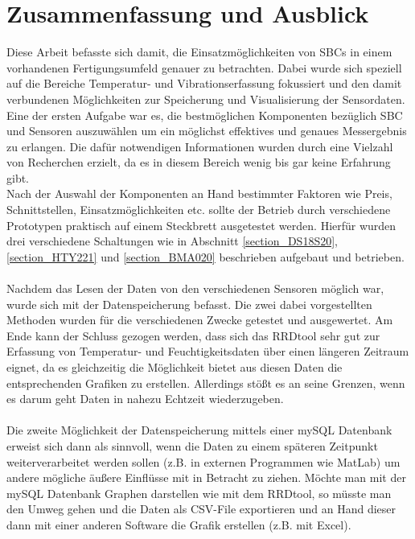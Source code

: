 \chapter{Zusammenfassung und Ausblick}
\label{chapter Zusammenfassung und Ausblick}
Diese Arbeit befasste sich damit, die Einsatzmöglichkeiten von SBCs in einem vorhandenen Fertigungsumfeld genauer zu betrachten. Dabei wurde sich speziell auf die Bereiche Temperatur- und Vibrationserfassung fokussiert und den damit verbundenen Möglichkeiten zur Speicherung und Visualisierung der Sensordaten. Eine der ersten Aufgabe war es, die bestmöglichen Komponenten bezüglich SBC und Sensoren auszuwählen um ein möglichst effektives und genaues Messergebnis zu erlangen. Die dafür notwendigen Informationen wurden durch eine Vielzahl von Recherchen erzielt, da es in diesem Bereich wenig bis gar keine Erfahrung gibt.\\
Nach der Auswahl der Komponenten an Hand bestimmter Faktoren wie Preis, Schnittstellen, Einsatzmöglichkeiten etc. sollte der Betrieb durch verschiedene Prototypen praktisch auf einem Steckbrett ausgetestet werden. Hierfür wurden drei verschiedene Schaltungen wie in Abschnitt \ref{section_DS18S20}, \ref{section_HTY221} und \ref{section_BMA020} beschrieben aufgebaut und betrieben.\\\\
Nachdem das Lesen der Daten von den verschiedenen Sensoren möglich war, wurde sich mit der Datenspeicherung befasst. Die zwei dabei vorgestellten Methoden wurden für die verschiedenen Zwecke getestet und ausgewertet. Am Ende kann der Schluss gezogen werden, dass sich das RRDtool sehr gut zur Erfassung von Temperatur- und Feuchtigkeitsdaten über einen längeren Zeitraum eignet, da es gleichzeitig die Möglichkeit bietet aus diesen Daten die entsprechenden Grafiken zu erstellen. Allerdings stößt es an seine Grenzen, wenn es darum geht Daten in nahezu Echtzeit wiederzugeben. 
\\\\Die zweite Möglichkeit der Datenspeicherung mittels einer mySQL Datenbank erweist sich dann als sinnvoll, wenn die Daten zu einem späteren Zeitpunkt weiterverarbeitet werden sollen (z.B. in externen Programmen wie MatLab) um andere mögliche äußere Einflüsse mit in Betracht zu ziehen. Möchte man mit der mySQL Datenbank Graphen darstellen wie mit dem RRDtool, so müsste man den Umweg gehen und die Daten als CSV-File exportieren und an Hand dieser dann mit einer anderen Software die Grafik erstellen (z.B. mit Excel).\\\\
